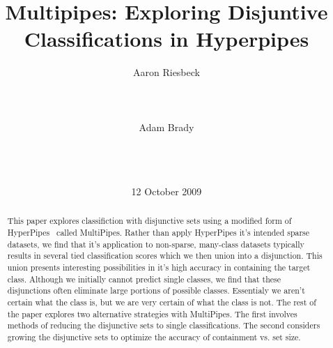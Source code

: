 \documentclass{acm_proc_article-sp}
\begin{document}
\title{Multipipes: Exploring Disjuntive Classifications in Hyperpipes}

%
\author{
%
\alignauthor
Aaron Riesbeck\\
       \\
       \\
       \\
\alignauthor
Adam Brady\\
       \\
       \\
       \\
}
\date{12 October 2009}

\maketitle
\begin{abstract}

This paper explores classifiction with disjunctive sets using a modified form of HyperPipes~\cite{Eisenstein04} called MultiPipes. Rather than apply HyperPipes it's intended sparse datasets, we find that it's application to non-sparse, many-class datasets typically results in several tied classification scores which we then union into a disjunction. This union presents interesting possibilities in it's high accuracy in containing the target class. Although we initially cannot predict single classes, we find that these disjunctions often eliminate large portions of possible classes. Essentialy we aren't certain what the class is, but we are very certain of what the class is not. The rest of the paper explores two alternative strategies with MultiPipes. The first involves methods of reducing the disjunctive sets to single classifications. The second considers growing the disjunctive sets to optimize the accuracy of containment vs. set size.

\end{abstract}

\end{document}
